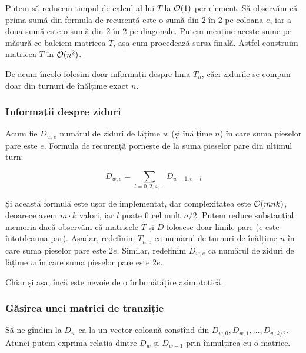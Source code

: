 \documentclass[../main.tex]{subfiles}
\begin{document}
Putem să reducem timpul de calcul al lui $T$ la $\mathcal{O}(1)$ per element. Să observăm că prima sumă din formula de recurență este o sumă din 2 în 2 pe coloana $e$, iar a doua sumă este o sumă din 2 în 2 pe diagonale. Putem menține aceste sume pe măsură ce baleiem matricea $T$, așa cum procedează sursa finală. Astfel construim matricea $T$ în $\mathcal{O}(n^2)$.

De acum încolo folosim doar informații despre linia $T_{n}$, căci zidurile se compun doar din turnuri de înălțime exact $n$.

\subsubsection*{Informații despre ziduri}

Acum fie $D_{w,e}$ numărul de ziduri de lățime $w$ (și înălțime $n$) în care suma pieselor pare este $e$. Formula de recurență pornește de la suma pieselor pare din ultimul turn:

$$D_{w,e} = \sum_{l = 0, 2, 4, \dots} D_{w - 1, e - l}$$

Și această formulă este ușor de implementat, dar complexitatea este $\mathcal{O}(m n k)$, deoarece avem $m \cdot k$ valori, iar $l$ poate fi cel mult $n/2$. Putem reduce substanțial memoria dacă observăm că matricele $T$ și $D$ folosesc doar liniile pare ($e$ este întotdeauna par). Așadar, redefinim $T_{n,e}$ ca numărul de turnuri de înălțime $n$ în care suma pieselor pare este $2e$. Similar, redefinim $D_{w,e}$ ca numărul de ziduri de lățime $w$ în care suma pieselor pare este $2e$.

Chiar și așa, încă este nevoie de o îmbunătățire asimptotică.

\subsubsection*{Găsirea unei matrici de tranziție}

Să ne gîndim la $D_w$ ca la un vector-coloană constînd din $D_{w,0}, D_{w,1}, \dots, D_{w,k/2}$. Atunci putem exprima relația dintre $D_w$ și $D_{w-1}$ prin înmulțirea cu o matrice.
\end{document}
